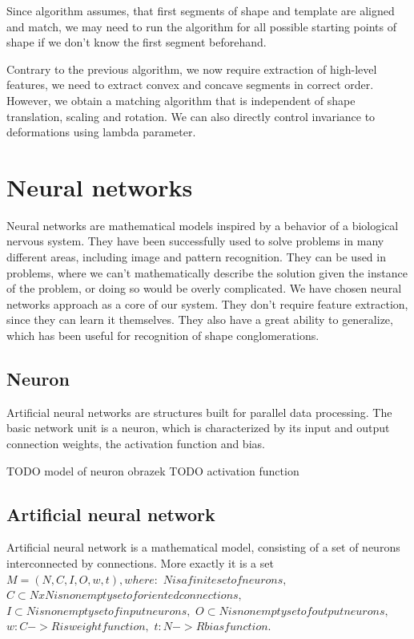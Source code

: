 Since algorithm assumes, that first segments of shape and template are aligned and match, we may need to run the algorithm for all possible starting points of shape if we don't know the first segment beforehand.

Contrary to the previous algorithm, we now require extraction of high-level features, we need to extract convex and concave segments in correct order. However, we obtain a matching algorithm that is independent of shape translation, scaling and rotation. We can also directly control invariance to deformations using lambda parameter.

\chapter{Neural networks}
Neural networks are mathematical models inspired by a behavior of a biological nervous system. They have been successfully used to solve problems in many different areas, including image and pattern recognition. They can be used in problems, where we can't mathematically describe the solution given the instance of the problem, or doing so would be overly complicated. We have chosen neural networks approach as a core of our system. They don't require feature extraction, since they can learn it themselves. They also have a great ability to generalize, which has been useful for recognition of shape conglomerations.

\section{Neuron}
Artificial neural networks are structures built for parallel data processing. The basic network unit is a neuron, which is characterized by its input and output connection weights, the activation function and bias.

TODO model of neuron obrazek
TODO activation function

\section{Artificial neural network}
Artificial neural network is a mathematical model, consisting of a set of neurons interconnected by connections.
More exactly it is a set 
$
M  =  (N,C,I,O,w,t), where: $
 $N is a finite set of neurons,$
 $C \subset N x N is nonempty set of oriented connections,$
$I \subset N is nonempty set of input neurons,$
$O \subset N is nonempty set of output neurons,$
$w : C -> R is weight function, $
$t : N->R bias function.$


